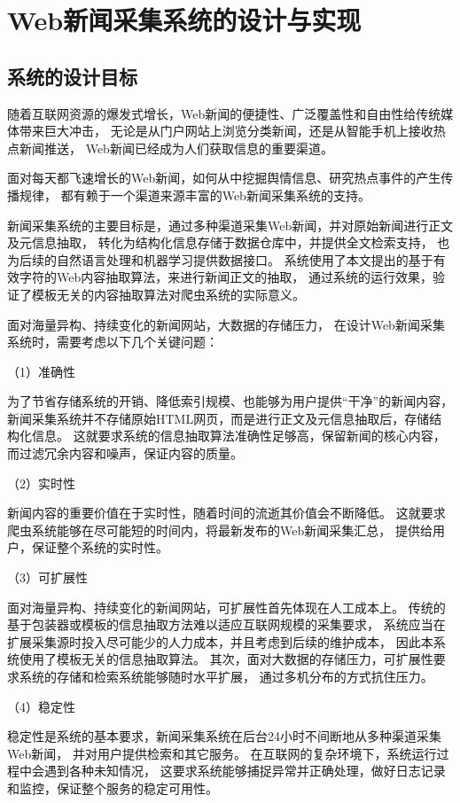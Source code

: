 
\chapter{Web新闻采集系统的设计与实现}

\section{系统的设计目标}
\label{sec:system-intro}

随着互联网资源的爆发式增长，Web新闻的便捷性、广泛覆盖性和自由性给传统媒体带来巨大冲击，
无论是从门户网站上浏览分类新闻，还是从智能手机上接收热点新闻推送，
Web新闻已经成为人们获取信息的重要渠道。

面对每天都飞速增长的Web新闻，如何从中挖掘舆情信息、研究热点事件的产生传播规律，
都有赖于一个渠道来源丰富的Web新闻采集系统的支持。

新闻采集系统的主要目标是，通过多种渠道采集Web新闻，并对原始新闻进行正文及元信息抽取，
转化为结构化信息存储于数据仓库中，并提供全文检索支持，
也为后续的自然语言处理和机器学习提供数据接口。
系统使用了本文提出的基于有效字符的Web内容抽取算法，来进行新闻正文的抽取，
通过系统的运行效果，验证了模板无关的内容抽取算法对爬虫系统的实际意义。

面对海量异构、持续变化的新闻网站，大数据的存储压力，
在设计Web新闻采集系统时，需要考虑以下几个关键问题：

（1）准确性

为了节省存储系统的开销、降低索引规模、也能够为用户提供“干净”的新闻内容，
新闻采集系统并不存储原始HTML网页，而是进行正文及元信息抽取后，存储结构化信息。
这就要求系统的信息抽取算法准确性足够高，保留新闻的核心内容，
而过滤冗余内容和噪声，保证内容的质量。

（2）实时性

新闻内容的重要价值在于实时性，随着时间的流逝其价值会不断降低。
这就要求爬虫系统能够在尽可能短的时间内，将最新发布的Web新闻采集汇总，
提供给用户，保证整个系统的实时性。

（3）可扩展性

面对海量异构、持续变化的新闻网站，可扩展性首先体现在人工成本上。
传统的基于包装器或模板的信息抽取方法难以适应互联网规模的采集要求，
系统应当在扩展采集源时投入尽可能少的人力成本，并且考虑到后续的维护成本，
因此本系统使用了模板无关的信息抽取算法。
其次，面对大数据的存储压力，可扩展性要求系统的存储和检索系统能够随时水平扩展，
通过多机分布的方式抗住压力。

（4）稳定性

稳定性是系统的基本要求，新闻采集系统在后台24小时不间断地从多种渠道采集Web新闻，
并对用户提供检索和其它服务。
在互联网的复杂环境下，系统运行过程中会遇到各种未知情况，
这要求系统能够捕捉异常并正确处理，做好日志记录和监控，保证整个服务的稳定可用性。

